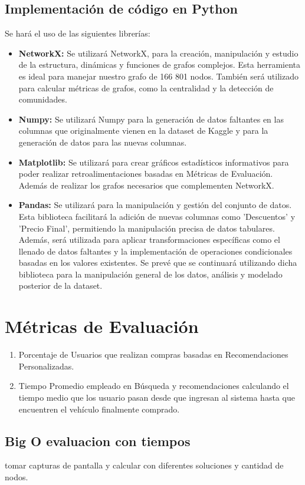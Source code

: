 \documentclass[12pt]{article}
\begin{document}
\subsection{Implementación de código en Python}
Se hará el uso de las siguientes librerías:
\begin{itemize}
    \item \textbf{NetworkX:} Se utilizará NetworkX, para la creación, manipulación y estudio de la estructura, dinámicas y funciones de grafos complejos. Esta herramienta es ideal para manejar nuestro grafo de 166 801 nodos. También será utilizado para calcular métricas de grafos, como la centralidad y la detección de comunidades.
    \item \textbf{Numpy:} Se utilizará Numpy para la generación de datos faltantes en las columnas que originalmente vienen en la dataset de Kaggle y para la generación de datos para las nuevas columnas.
    \item \textbf{Matplotlib:} Se utilizará para crear gráficos estadísticos informativos para poder realizar retroalimentaciones basadas en Métricas de Evaluación. Además de realizar los grafos necesarios que complementen NetworkX.
    \item \textbf{Pandas:} Se utilizará para la manipulación y gestión del conjunto de datos. Esta biblioteca facilitará la adición de nuevas columnas como 'Descuentos' y 'Precio Final', permitiendo la manipulación precisa de datos tabulares. Además, será utilizada para aplicar transformaciones específicas como el llenado de datos faltantes y la implementación de operaciones condicionales basadas en los valores existentes. Se prevé que se continuará utilizando dicha biblioteca para la manipulación general de los datos, análisis y modelado posterior de la dataset.
\end{itemize}

\section{Métricas de Evaluación}
\begin{enumerate}
    \item Porcentaje de Usuarios que realizan compras basadas en Recomendaciones Personalizadas.
    \item Tiempo Promedio empleado en Búsqueda y recomendaciones calculando el tiempo medio que los usuario pasan desde que ingresan al sistema hasta que encuentren el vehículo finalmente comprado.
\end{enumerate}
\subsection{Big O \- evaluacion con tiempos}
tomar capturas de pantalla y calcular con diferentes soluciones y cantidad de nodos.
\end{document}
